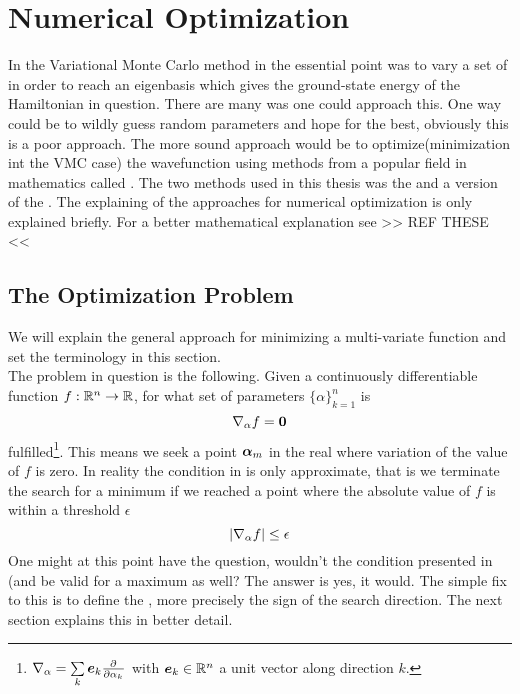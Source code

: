 \chapter{Numerical Optimization \label{chapter:5}}
    In the Variational Monte Carlo method in  the essential point
    was to vary a set of  in order to reach an
    eigenbasis which gives the ground-state energy of the Hamiltonian in
    question. There are many was one could approach this. One way could be to
    wildly guess random parameters and hope for the best, obviously this is a
    poor approach. The more sound approach would be to optimize(minimization
    int the VMC case) the wavefunction using methods from a popular field in
    mathematics called . The two methods used in
    this thesis was the  and a version of the
    . The explaining of the
    approaches for numerical optimization is only explained briefly. For a
    better mathematical explanation see >> REF THESE <<

\section{The Optimization Problem \label{sec:the_optimization_problem}}
    We will explain the general approach for minimizing a multi-variate
    function and set the terminology in this section. \\

    The problem in question is the following. Given a continuously
    differentiable function $f:\mathbb{R}^n\rightarrow\mathbb{R}$, for what set of
    parameters $\{\alpha\}^{n}_{k=1}$ is 
        \begin{equation}
            \nabla_{\alpha} f = \boldsymbol{{0}}
            \label{eq:mincondition}
        \end{equation}
    fulfilled\footnote{$\nabla_{\alpha}=\sum\limits_k\blds{e}_k\prd{\alpha_k}$
    with $\boldsymbol{{e}}_k\in\mathbb{R}^n$ a unit vector along direction $k$.}. This
    means we seek a point $\boldsymbol{{\alpha}}_m$ in the real where variation of the
    value of $f$ is zero. In reality the condition in  is
    only approximate, that is we terminate the search for a minimum if we
    reached a point where the absolute value of $f$ is within a threshold
    $\epsilon$
        \begin{equation}
            \abs{\nabla_{\alpha} f} \leq \epsilon
            \label{eq:minconditionapprox}
        \end{equation}
    One might at this point have the question, wouldn't the condition presented
    in (and  be valid for a
    maximum as well? The answer is yes, it would. The simple fix to this is to
    define the , more precisely the sign of the search
    direction. The next section explains this in better detail.

